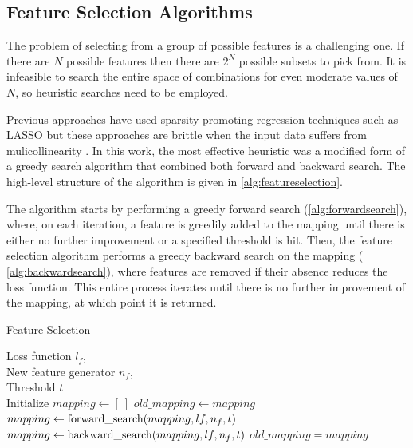 \documentclass{article}
\begin{document}
\subsection{Feature Selection Algorithms}

The problem of selecting from a group of possible features is a challenging one. If there are $N$ possible features then there are $2^N$ possible subsets to pick from. It is infeasible to search the entire space of combinations for even moderate values of $N$, so heuristic searches need to be employed. 

Previous approaches have used sparsity-promoting regression techniques such as LASSO \cite{tibshirani1996regression} but these approaches are brittle when the input data suffers from mulicollinearity \cite{rudy2017data}. In this work, the most effective heuristic was a modified form of a greedy search algorithm that combined both forward and backward search. The high-level structure of the algorithm is given in \cref{alg:featureselection}.

The algorithm starts by performing a greedy forward search (\cref{alg:forwardsearch}), where, on each iteration, a feature is greedily added to the mapping until there is either no further improvement or a specified threshold is hit. Then, the feature selection algorithm performs a greedy backward search on the mapping ( \cref{alg:backwardsearch}), where features are removed if their absence reduces the loss function. This entire process iterates until there is no further improvement of the mapping, at which point it is returned.

\begin{algorithm}[tb]
   \caption{Feature Selection}
   \label{alg:featureselection}
\begin{algorithmic}
    Loss function $l_f$, \\
   \quad \quad \quad New feature generator $n_f$, \\
   \quad \quad \quad Threshold $t$ \\
   \STATE Initialize $mapping \gets [ \ ]$
   \REPEAT
   \STATE $old\_mapping \gets mapping$
   \STATE $mapping \gets {\rm forward\_search}(mapping, lf, n_f, t)$
   \STATE $mapping \gets {\rm backward\_search}(mapping, lf, n_f, t)$
   \UNTIL $old\_mapping = mapping$
\end{algorithmic}
\end{algorithm}
\end{document}

